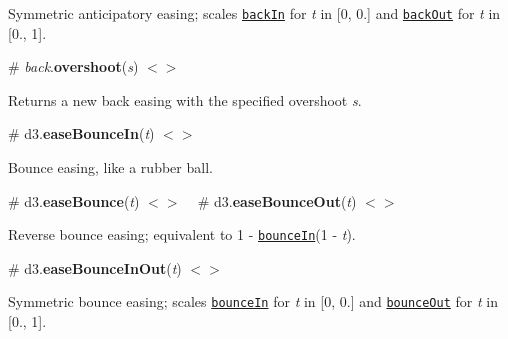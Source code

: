 Symmetric anticipatory easing; scales \href{#easeBackIn}{\tt back\+In} for {\itshape t} in \mbox{[}0, 0.\mbox{]} and \href{#easeBackOut}{\tt back\+Out} for {\itshape t} in \mbox{[}0., 1\mbox{]}.

\href{http://bl.ocks.org/mbostock/248bac3b8e354a9103c4/#backInOut}{\tt }

\label{_back_overshoot}%
\# {\itshape back}.{\bfseries overshoot}({\itshape s}) \href{https://github.com/d3/d3-ease/blob/master/src/back.js#L1}{\tt $<$$>$}

Returns a new back easing with the specified overshoot {\itshape s}.

\label{_easeBounceIn}%
\# d3.{\bfseries ease\+Bounce\+In}({\itshape t}) \href{https://github.com/d3/d3-ease/blob/master/src/bounce.js#L12}{\tt $<$$>$}

Bounce easing, like a rubber ball.

\href{http://bl.ocks.org/mbostock/248bac3b8e354a9103c4/#bounceIn}{\tt }

\label{_easeBounce}%
\# d3.{\bfseries ease\+Bounce}({\itshape t}) \href{https://github.com/d3/d3-ease/blob/master/src/bounce.js}{\tt $<$$>$} ~\newline
\label{_easeBounceOut}%
\# d3.{\bfseries ease\+Bounce\+Out}({\itshape t}) \href{https://github.com/d3/d3-ease/blob/master/src/bounce.js#L16}{\tt $<$$>$}

Reverse bounce easing; equivalent to 1 -\/ \href{#easeBounceIn}{\tt bounce\+In}(1 -\/ {\itshape t}).

\href{http://bl.ocks.org/mbostock/248bac3b8e354a9103c4/#bounceOut}{\tt }

\label{_easeBounceInOut}%
\# d3.{\bfseries ease\+Bounce\+In\+Out}({\itshape t}) \href{https://github.com/d3/d3-ease/blob/master/src/bounce.js#L20}{\tt $<$$>$}

Symmetric bounce easing; scales \href{#easeBounceIn}{\tt bounce\+In} for {\itshape t} in \mbox{[}0, 0.\mbox{]} and \href{#easeBounceOut}{\tt bounce\+Out} for {\itshape t} in \mbox{[}0., 1\mbox{]}.

\href{http://bl.ocks.org/mbostock/248bac3b8e354a9103c4/#bounceInOut}{\tt } 